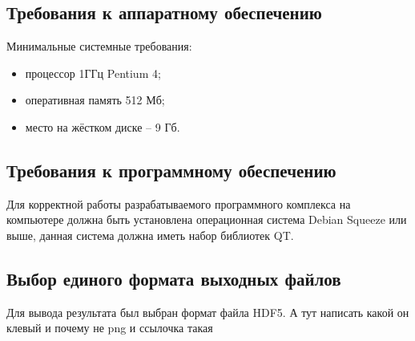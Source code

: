 \subsection {Требования к аппаратному обеспечению}
Минимальные системные требования:

\begin{itemize}
\item процессор 1ГГц Pentium 4;
\item оперативная память 512 Мб;
\item место на жёстком диске -- 9 Гб.
\end{itemize}

\subsection {Требования к программному обеспечению}
Для корректной работы разрабатываемого программного комплекса на компьютере должна быть установлена операционная система Debian Squeeze или выше, данная система должна иметь набор библиотек QT.

\subsection {Выбор единого формата выходных файлов}
Для вывода результата был выбран формат файла HDF5. А тут написать какой он клевый и почему не png и ссылочка такая \cite{hdf5}%